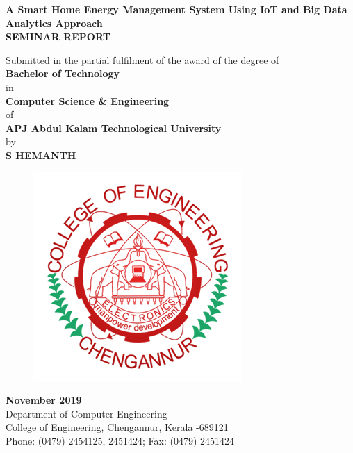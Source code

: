\documentclass[a4paper,12pt,oneside]{article}
\begin{document}
\thispagestyle{empty}
\begin{center}

\large{\textbf{{A Smart Home Energy Management System
Using IoT and Big Data Analytics Approach}}}
\setlength{\baselineskip}{1.5\baselineskip}
\\
\vspace{5mm}
\textbf{SEMINAR REPORT}

Submitted in the partial fulfilment of the award of the degree
of
\\
\textbf{Bachelor of Technology}
\\
in
\\
\textbf{Computer Science \& Engineering}
\\
of
\\
\textbf{APJ Abdul Kalam Technological University}
\\
by
\\
\textbf{S HEMANTH}
\\
\vspace{5mm}
\begin{figure}[H]
\centering
\includegraphics[scale=0.5]{ceclogo.png}
\end{figure}
\textbf{November 2019}
\vspace{8mm}
\\
Department of Computer Engineering
\\
College of Engineering, Chengannur, Kerala -689121
\\
Phone: (0479) 2454125, 2451424; Fax: (0479) 2451424
\\
\end{center}
\end{document}
